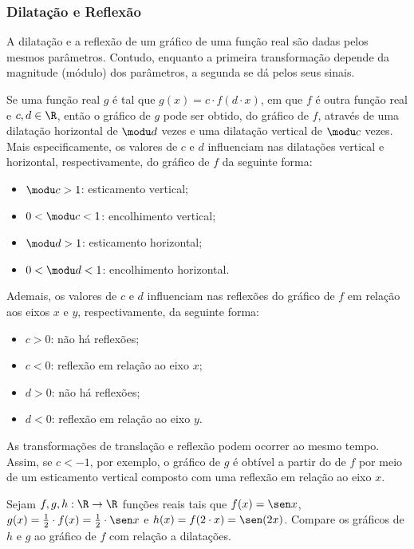 \subsubsection{Dilatação e Reflexão}

A dilatação e a reflexão de um gráfico de uma função real são dadas pelos mesmos parâmetros.
Contudo, enquanto a primeira transformação depende da magnitude (módulo) dos parâmetros, a segunda se dá pelos seus sinais.

Se uma função real $g$ é tal que $g(x) = c \cdot f(d\cdot x)$, em que $f$ é outra função real e $c,d\in \R$, então o gráfico de $g$ pode ser obtido, do gráfico de $f$, através de uma dilatação horizontal de $\modu d$ vezes e uma dilatação vertical de $\modu c$ vezes. 
Mais especificamente, os valores de $c$ e $d$ influenciam nas dilatações vertical e horizontal, respectivamente, do gráfico de $f$ da seguinte forma:
%
\begin{itemize}
          \item $\modu c>1$: esticamento vertical;
          \item $0<\modu c<1$: encolhimento vertical;
          \item $\modu d>1$: esticamento horizontal;
          \item $0<\modu d<1$: encolhimento horizontal.
\end{itemize}
%
Ademais, os valores de $c$ e $d$ influenciam nas reflexões do gráfico de $f$ em relação aos eixos $x$ e $y$, respectivamente, da seguinte forma:
%
\begin{itemize}
  \item $c > 0$: não há reflexões;
  \item $c < 0$: reflexão em relação ao eixo $x$;
  \item $d > 0$: não há reflexões;
  \item $d < 0$: reflexão em relação ao eixo $y$.
\end{itemize}

As transformações de translação e reflexão podem ocorrer ao mesmo tempo.
Assim, se $c<-1$, por exemplo, o gráfico de $g$ é obtível a partir do de $f$ por meio de um esticamento vertical composto com uma reflexão em relação ao eixo $x$.

\begin{example}
  Sejam $f, g , h: \R \to \R$ funções reais tais que $f(x) = \sen x$, $g(x) = \frac 1 2 \cdot f(x)  = \frac 1 2 \cdot \sen x $ e $h(x)= f(2 \cdot x)= \sen (2x)$.
  Compare os gráficos de $h$ e $g$ ao gráfico de $f$ com relação a dilatações.
\end{example}


